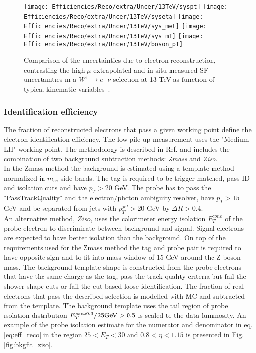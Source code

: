     \begin{figure}[htbp]
    	\begin{center}
    		\texttt{[image: Efficiencies/Reco/extra/Uncer/13TeV/syspt]}
    		\texttt{[image: Efficiencies/Reco/extra/Uncer/13TeV/syseta]}
    		\texttt{[image: Efficiencies/Reco/extra/Uncer/13TeV/sys\_met]}
    		\texttt{[image: Efficiencies/Reco/extra/Uncer/13TeV/sys\_mT]}
    	     \texttt{[image: Efficiencies/Reco/extra/Uncer/13TeV/boson\_pT]}
    		\caption{Comparison of the uncertainties due to electron
    			reconstruction, contrasting the high-$\mu$-extrapolated and
    			in-situ-measured SF uncertainties in a $W^{+}\rightarrow
    			e^{+}\nu$ selection at 13 TeV as function of typical kinematic variables~\cite{int_note_electrons}.}
    		\label{fig:extra_sys_13_medium}
    	\end{center}
    \end{figure}
\clearpage
    \subsubsection{Identification efficiency}
    The fraction of reconstructed electrons that pass a given working point define the electron identification efficiency. The low pile-up \Wen measurement uses the "Medium LH" working point. The methodology is described in Ref. \cite{electrons_reco1} and includes the combination of two background subtraction methods: \textit{Zmass} and \textit{Ziso}. \\
    In the Zmass method the background is estimated using a template method normalized in $m_{ee}$ side bands. The tag is required to be trigger-matched, pass ID and isolation cuts and have $p_T>20$ GeV. The probe has to pass the "PassTrackQuality" and the electron/photon ambiguity resolver, have $p_T>15$ GeV and be separated from jets with $p_T^{jet}>20$ GeV by $\Delta R>0.4$.\\
    An alternative method, $Ziso$, uses the calorimeter energy isolation $E_T^{cone}$ of the probe electron to discriminate between background and signal. Signal electrons are expected to have better isolation than the background. On top of the requirements used for the Zmass method the tag and probe pair is required to have opposite sign and to fit into mass window of 15 GeV around the Z boson mass. The background template shape is constructed from the probe electrons that have the same charge as the tag, pass the track quality criteria but fail the shower shape cuts or fail the cut-based loose identification. The fraction of real electrons that pass the described selection is modelled with MC and subtracted from the template. The background template uses the tail region of probe isolation distribution $E_T^{cone0.3}/25\text{Ge\kern -0.1em V} > 0.5$ is scaled to the data luminosity. An example of the probe isolation estimate for the numerator and denominator in eq. \ref{eq:eff_reco} in the region $25<E_T<30$ and $0.8<\eta<1.15$ is presented in Fig. \ref{fig:bkgfit_ziso}.
    
